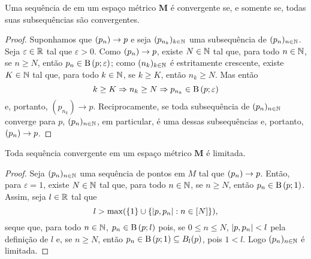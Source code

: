 \begin{proposition}
Uma sequência de em um espaço métrico $\bm M$ é convergente se, e somente se, todas suas subsequências são convergentes.
\end{proposition}
\begin{proof}
	Suponhamos que $(p_n) \rightarrow p$ e seja $(p_{n_k})_{k \in \mathbb{N}}$ uma subsequência de $(p_n)_{n \in \mathbb{N}}$. Seja $\varepsilon \in \mathbb{R}$ tal que $\varepsilon > 0$. Como $(p_n) \rightarrow p$, existe $N \in \mathbb{N}$ tal que, para todo $n \in \mathbb{N}$, se $n \geq N$, então $p_n \in \mathrm{B}\left(p; \varepsilon\right)$; como $(n_k)_{k \in \mathbb{N}}$ é estritamente crescente, existe $K \in \mathbb{N}$ tal que, para todo $k \in \mathbb{N}$, se $k \geq K$, então $n_k \geq N$. Mas então
	\begin{equation*}
	k \geq K \Rightarrow n_k \geq N \Rightarrow p_{n_k} \in \mathrm{B}\left(p; \varepsilon\right)
	\end{equation*}
e, portanto, $(p_{n_k}) \to p$.	Reciprocamente, se toda subsequência de $(p_n)_{n \in \mathbb{N}}$ converge para $p$, $(p_n)_{n \in \mathbb{N}}$, em particular, é uma dessas subsequências e, portanto, $(p_n) \rightarrow p$.
\end{proof}

\begin{proposition}
Toda sequência convergente em um espaço métrico $\bm M$ é limitada.
\end{proposition}
\begin{proof}
	Seja $(p_n)_{n \in \mathbb{N}}$ uma sequência de pontos em $M$ tal que $(p_n) \rightarrow p$. Então, para $\varepsilon = 1$, existe $N \in \mathbb{N}$ tal que, para todo $n \in \mathbb{N}$, se $n \geq N$, então $p_n \in \mathrm{B}\left(p; 1\right)$. Assim, seja $l \in \mathbb{R}$ tal que
	\begin{equation*}
	l > \max(\{1\} \cup \{\left\vert{p},{p_n}\right\vert : n \in [N]\}),
	\end{equation*}
seque que, para todo $n \in \mathbb{N}$, $p_n \in \mathrm{B}\left(p; l\right)$ pois, se $0 \leq n \leq N$, $\left\vert{p},{p_n}\right\vert < l$ pela definição de $l$ e, se $n \geq N$, então $p_n \in \mathrm{B}\left(p; 1\right) \subseteq B_l(p)$, pois $1 < l$. Logo $(p_n)_{n \in \mathbb{N}}$ é limitada.
\end{proof}

